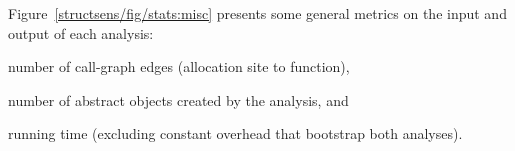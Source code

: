 
Figure~\ref{structsens/fig/stats:misc} presents some general metrics
on the input and output of each analysis:
\begin{inparaenum}[(i)]
\item number of call-graph edges (allocation site to function),
\item number of abstract objects created by the analysis, and
\item running time (excluding constant overhead that bootstrap both
  analyses).
\end{inparaenum}

